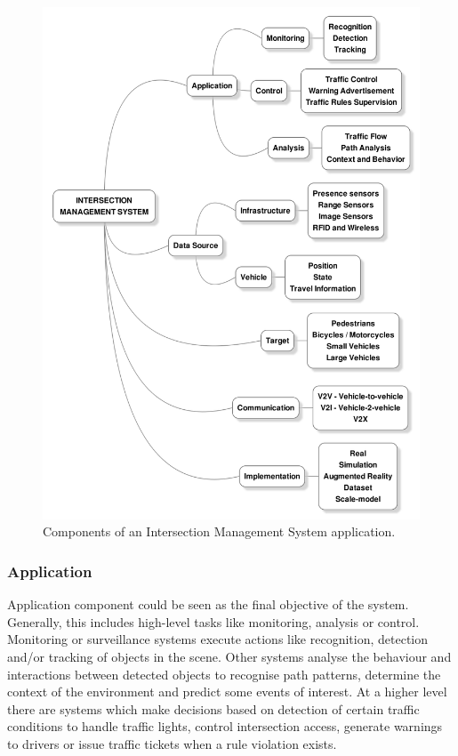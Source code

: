 \documentclass[conference]{IEEEtran}
\begin{document}
\begin{figure}[ht!]
\centering
\includegraphics[scale=0.17]{../fig/2/ims_graph5.png}
\caption{Components of an Intersection Management System application.}
\label{imsComps}
\end{figure}

\subsubsection{Application}

Application component could be seen as the final objective of the system. Generally, this includes high-level tasks like monitoring, analysis or control. Monitoring or surveillance systems execute actions like recognition, detection and/or tracking of objects in the scene. 
Other systems analyse the behaviour and interactions between detected objects to recognise path patterns, determine the context of the environment and predict some events of interest. At a higher level there are systems which make decisions based on detection of certain traffic conditions to handle traffic lights, control intersection access, generate warnings to drivers or issue traffic tickets when a rule violation exists.
\end{document}
